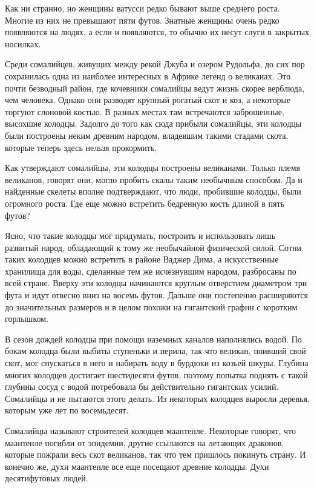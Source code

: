 \documentclass[12pt,a4paper,twoside,openany,svgnames]{memoir}
\begin{document}
Как ни странно, но женщины ватусси редко бывают выше среднего роста. Многие из них не превышают пяти футов. Знатные женщины очень редко появляются на людях, а если и появляются, то обычно их несут слуги в закрытых носилках.

Среди сомалийцев, живущих между рекой Джуба и озером Рудольфа, до сих пор сохранилась одна из наиболее интересных в Африке легенд о великанах. Это почти безводный район, где кочевники сомалийцы ведут жизнь скорее верблюда, чем человека. Однако они разводят крупный рогатый скот и коз, а некоторые торгуют слоновой костью. В разных местах там встречаются заброшенные, высохшие колодцы. Задолго до того как сюда прибыли сомалийцы, эти колодцы были построены неким древним народом, владевшим такими стадами скота, которые теперь здесь нельзя прокормить.

Как утверждают сомалийцы, эти колодцы построены великанами. Только племя великанов, говорят они, могло пробить скалы таким необычным способом. Да и найденные скелеты вполне подтверждают, что люди, пробившие колодцы, были огромного роста. Где еще можно встретить бедренную кость длиной в пять футов?

Ясно, что такие колодцы мог придумать, построить и использовать лишь развитый народ, обладающий к тому же необычайной физической силой. Сотни таких колодцев можно встретить в районе Ваджер Дима, а искусственные хранилища для воды, сделанные тем же исчезнувшим народом, разбросаны по всей стране. Вверху эти колодцы начинаются круглым отверстием диаметром три фута и идут отвесно вниз на восемь футов. Дальше они постепенно расширяются до значительных размеров и в целом похожи на гигантский графин с коротким горлышком.

В сезон дождей колодцы при помощи наземных каналов наполнялись водой. По бокам колодца были выбиты ступеньки и перила, так что великан, поивший свой скот, мог спускаться в него и набирать воду в бурдюки из козьей шкуры. Глубина многих колодцев достигает шестидесяти футов, поэтому попытка поднять с такой глубины сосуд с водой потребовала бы действительно гигантских усилий. Сомалийцы и не пытаются этого делать. Из некоторых колодцев выросли деревья, которым уже лет по восемьдесят.

Сомалийцы называют строителей колодцев маантенле. Некоторые говорят, что маантенле погибли от эпидемии, другие ссылаются на летающих драконов, которые пожрали весь скот великанов, так что тем пришлось покинуть страну. И конечно же, духи маантенле все еще посещают древние колодцы. Духи десятифутовых людей.
\end{document}
